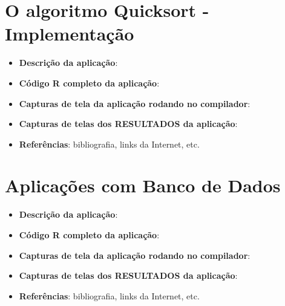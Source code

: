     \section{O algoritmo Quicksort - Implementa\c{c}\~{a}o}
    \begin{itemize}
      \item \textbf{Descri\c{c}\~{a}o da aplica\c{c}\~{a}o}:
      \item \textbf{C\'{o}digo R completo da aplica\c{c}\~{a}o}:
      \item \textbf{Capturas de tela da aplica\c{c}\~{a}o rodando no compilador}:
      \item \textbf{Capturas de telas dos RESULTADOS da aplica\c{c}\~{a}o}:
      \item \textbf{Refer\^{e}ncias}: bibliografia, links da Internet, etc.
    \end{itemize}
    
    \section{Aplica\c{c}\~{o}es com Banco de Dados}
    \begin{itemize}
      \item \textbf{Descri\c{c}\~{a}o da aplica\c{c}\~{a}o}:
      \item \textbf{C\'{o}digo R completo da aplica\c{c}\~{a}o}:
      \item \textbf{Capturas de tela da aplica\c{c}\~{a}o rodando no compilador}:
      \item \textbf{Capturas de telas dos RESULTADOS da aplica\c{c}\~{a}o}:
      \item \textbf{Refer\^{e}ncias}: bibliografia, links da Internet, etc.
    \end{itemize}
